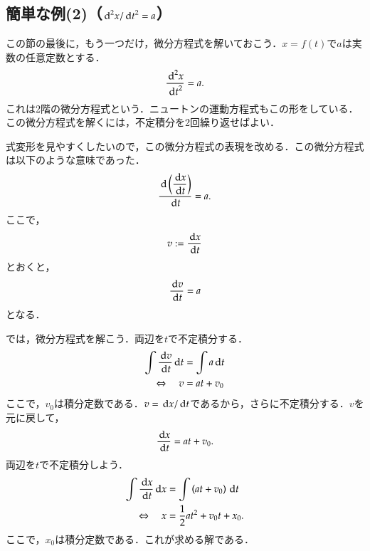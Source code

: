            \subsection{簡単な例(2)（${\,\mathrm{d}}^{2} x/{\,\mathrm{d} t}^{2} = a$）}
                この節の最後に，もう一つだけ，微分方程式を解いておこう．$x=f(t)$で$a$は実数の任意定数とする．
                \[
                    \frac{{\,\mathrm{d}}^{2} x}{{\,\mathrm{d} t}^{2}} = a.
                \]
                これは2階の微分方程式という．ニュートンの運動方程式もこの形をしている．
                この微分方程式を解くには，不定積分を2回繰り返せばよい．

                式変形を見やすくしたいので，この微分方程式の表現を改める．この微分方程式は以下のような意味であった．
                \[
                    \frac{\,\mathrm{d} \displaystyle \left(\frac{\,\mathrm{d} x}{\,\mathrm{d} t}\right)}{\,\mathrm{d} t}= a.
                \]
                ここで，
                \[
                    v := \frac{\,\mathrm{d} x}{\,\mathrm{d} t}
                \]
                とおくと，
                \[
                    \frac{\,\mathrm{d} v}{\,\mathrm{d} t}= a
                \]
                となる．

                では，微分方程式を解こう．両辺を$t$で不定積分する．
                \begin{align*}
                    \int \frac{\,\mathrm{d} v}{\,\mathrm{d} t} \,\mathrm{d} t &= \int a \,\mathrm{d} t \\
                    \Leftrightarrow \quad v &= at + {v}_{0}
                \end{align*}
                ここで，${v}_{0}$は積分定数である．$v=\,\mathrm{d} x/\,\mathrm{d} t$であるから，さらに不定積分する．$v$を元に戻して，
                \[
                    \frac{\,\mathrm{d} x}{\,\mathrm{d} t}  = at + {v}_{0}.
                \]
                両辺を$t$で不定積分しよう．
                \begin{align*}
                    \int \frac{\,\mathrm{d} x}{\,\mathrm{d} t} \,\mathrm{d} x &= \int \left( at + {v}_{0} \right) \,\mathrm{d} t \\
                    \Leftrightarrow \quad x &= \frac{1}{2} {at}^{2} + {v}_{0}t + {x}_{0}.
                \end{align*}
                ここで，${x}_{0}$は積分定数である．これが求める解である．

